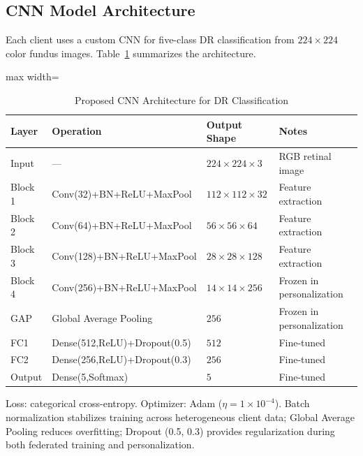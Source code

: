 \documentclass[10pt, conference]{IEEEtran}
\begin{document}
\subsection{CNN Model Architecture}

Each client uses a custom CNN for five-class DR classification from
$224\times224$ color fundus images. Table~\ref{tab:cnnarch} summarizes the
architecture.

\begin{table}[!htbp]
\centering
\caption{Proposed CNN Architecture for DR Classification}
\label{tab:cnnarch}
\scriptsize
\begin{adjustbox}{max width=\columnwidth}
\begin{tabular}{llp{1.8cm}p{2.3cm}}
\toprule
\textbf{Layer} & \textbf{Operation} & \textbf{Output Shape} & \textbf{Notes} \\
\midrule
Input   & ---                                      & $224\!\times\!224\!\times\!3$ & RGB retinal image \\
Block 1 & Conv(32)+BN+ReLU+MaxPool                 & $112\!\times\!112\!\times\!32$ & Feature extraction \\
Block 2 & Conv(64)+BN+ReLU+MaxPool                 & $56\!\times\!56\!\times\!64$  & Feature extraction \\
Block 3 & Conv(128)+BN+ReLU+MaxPool                & $28\!\times\!28\!\times\!128$ & Feature extraction \\
Block 4 & Conv(256)+BN+ReLU+MaxPool                & $14\!\times\!14\!\times\!256$ & Frozen in personalization \\
GAP     & Global Average Pooling                   & $256$                        & Frozen in personalization \\
FC1     & Dense(512,ReLU)+Dropout(0.5)             & $512$                        & Fine-tuned \\
FC2     & Dense(256,ReLU)+Dropout(0.3)             & $256$                        & Fine-tuned \\
Output  & Dense(5,Softmax)                         & $5$                          & Fine-tuned \\
\bottomrule
\end{tabular}
\end{adjustbox}
\end{table}

\noindent
Loss: categorical cross-entropy. Optimizer: Adam ($\eta=1\times10^{-4}$). Batch
normalization stabilizes training across heterogeneous client data; Global
Average Pooling reduces overfitting; Dropout (0.5, 0.3) provides regularization
during both federated training and personalization.
\end{document}
